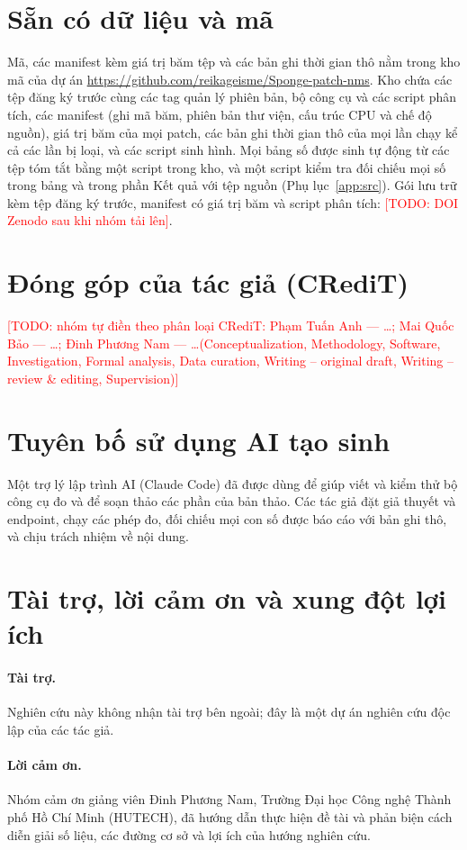 \documentclass[a4paper,fleqn]{cas-dc}
\newcommand{\todo}[1]{\textcolor{red}{[TODO: #1]}}
\begin{document}
\section*{Sẵn có dữ liệu và mã}
Mã, các manifest kèm giá trị băm tệp và các bản ghi thời gian thô nằm trong kho mã của dự án \url{https://github.com/reikageisme/Sponge-patch-nms}. Kho chứa các tệp đăng ký trước cùng các tag quản lý phiên bản, bộ công cụ và các script phân tích, các manifest (ghi mã băm, phiên bản thư viện, cấu trúc CPU và chế độ nguồn), giá trị băm của mọi patch, các bản ghi thời gian thô của mọi lần chạy kể cả các lần bị loại, và các script sinh hình. Mọi bảng số được sinh tự động từ các tệp tóm tắt bằng một script trong kho, và một script kiểm tra đối chiếu mọi số trong bảng và trong phần Kết quả với tệp nguồn (Phụ lục~\ref{app:src}). Gói lưu trữ kèm tệp đăng ký trước, manifest có giá trị băm và script phân tích: \todo{DOI Zenodo sau khi nhóm tải lên}.

\section*{Đóng góp của tác giả (CRediT)}
\todo{nhóm tự điền theo phân loại CRediT: Phạm Tuấn Anh --- \ldots; Mai Quốc Bảo --- \ldots; Đinh Phương Nam --- \ldots (Conceptualization, Methodology, Software, Investigation, Formal analysis, Data curation, Writing -- original draft, Writing -- review \& editing, Supervision)}

\section*{Tuyên bố sử dụng AI tạo sinh}
Một trợ lý lập trình AI (Claude Code) đã được dùng để giúp viết và kiểm thử bộ công cụ đo và để soạn thảo các phần của bản thảo. Các tác giả đặt giả thuyết và endpoint, chạy các phép đo, đối chiếu mọi con số được báo cáo với bản ghi thô, và chịu trách nhiệm về nội dung.

\section*{Tài trợ, lời cảm ơn và xung đột lợi ích}
\paragraph{Tài trợ.} Nghiên cứu này không nhận tài trợ bên ngoài; đây là một dự án nghiên cứu độc lập của các tác giả.
\paragraph{Lời cảm ơn.} Nhóm cảm ơn giảng viên Đinh Phương Nam, Trường Đại học Công nghệ Thành phố Hồ Chí Minh (HUTECH), đã hướng dẫn thực hiện đề tài và phản biện cách diễn giải số liệu, các đường cơ sở và lợi ích của hướng nghiên cứu.
\end{document}

